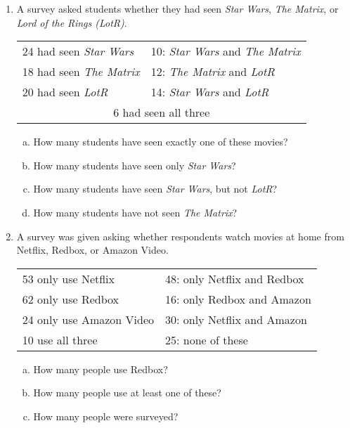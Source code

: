 \begin{enumerate}
\item A survey asked students whether they had seen \textit{Star Wars}, \textit{The Matrix}, or \textit{Lord of the Rings (LotR)}.
\begin{center}
\begin{tabular}{l l}
24 had seen \textit{Star Wars} & 10: \textit{Star Wars} and \textit{The Matrix}\\
18 had seen \textit{The Matrix} & 12: \textit{The Matrix} and \textit{LotR}\\
20 had seen \textit{LotR} & 14: \textit{Star Wars} and \textit{LotR}\\
\multicolumn{2}{c}{6 had seen all three}
\end{tabular}
\end{center}
\begin{enumerate}[(a)]
\item How many students have seen exactly one of these movies? 
\item How many students have seen only \textit{Star Wars}? 
\item How many students have seen \textit{Star Wars}, but not \textit{LotR}? 
\item How many students have not seen \textit{The Matrix}? 
\end{enumerate}

\item A survey was given asking whether respondents watch movies at home from Netflix, Redbox, or Amazon Video.
\begin{center}
\begin{tabular}{l l}
53 only use Netflix & 48: only Netflix and Redbox\\
62 only use Redbox & 16: only Redbox and Amazon\\
24 only use Amazon Video & 30: only Netflix and Amazon\\
10 use all three & 25: none of these
\end{tabular}
\end{center}
\begin{enumerate}[(a)]
\item How many people use Redbox? 
\item How many people use at least one of these? 
\item How many people were surveyed? 
\end{enumerate}


\end{enumerate}
